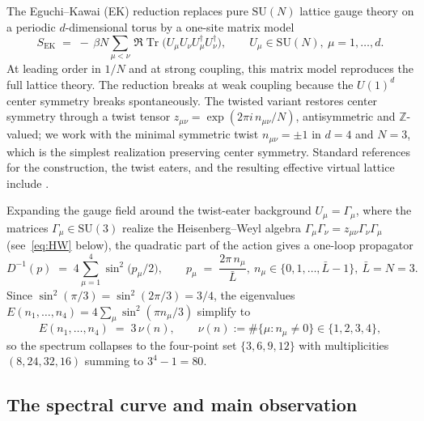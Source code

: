 \documentclass[11pt]{amsart}
\theoremstyle{definition}
\theoremstyle{remark}
\DeclareMathOperator{\Tr}{Tr}
\newcommand{\Z}{\mathbb{Z}}
\newcommand{\SU}{\mathrm{SU}}
\begin{document}
The Eguchi--Kawai (EK) reduction \cite{EguchiKawai1982} replaces pure
\(\SU(N)\) lattice gauge theory on a periodic \(d\)-dimensional torus
by a one-site matrix model
\[
  S_{\mathrm{EK}} \;=\; -\,\beta N \sum_{\mu<\nu}\,\Re\Tr\bigl(U_\mu
  U_\nu U_\mu^{\dagger} U_\nu^{\dagger}\bigr),
  \qquad U_\mu \in \SU(N),\ \mu = 1,\dots,d.
\]
At leading order in \(1/N\) and at strong coupling, this matrix model
reproduces the full lattice theory. The reduction breaks at weak
coupling because the \(U(1)^{d}\) center symmetry breaks
spontaneously. The twisted variant \cite{GonzalezArroyoOkawa1983}
restores center symmetry through a twist tensor
\(z_{\mu\nu} = \exp(2\pi i\,n_{\mu\nu}/N)\), antisymmetric and
\(\Z\)-valued; we work with the minimal symmetric twist
\(n_{\mu\nu} = \pm 1\) in \(d=4\) and \(N=3\), which is the simplest
realization preserving center symmetry. Standard references for the
construction, the twist eaters, and the resulting effective virtual
lattice include
\cite{CosterLucini2002,BringoltzSharpe2008,GonzalezArroyoOkawa2010}.

Expanding the gauge field around the twist-eater background
\(U_{\mu} = \Gamma_{\mu}\), where the matrices
\(\Gamma_{\mu} \in \SU(3)\) realize the Heisenberg--Weyl algebra
\(\Gamma_{\mu}\Gamma_{\nu} = z_{\mu\nu}\Gamma_{\nu}\Gamma_{\mu}\)
(see~\eqref{eq:HW} below), the quadratic part of the action gives a
one-loop propagator
\[
  D^{-1}(p) \;=\; 4 \sum_{\mu=1}^{4}\sin^{2}\!\bigl(p_{\mu}/2\bigr),
  \qquad
  p_{\mu} \;=\; \frac{2\pi\,n_{\mu}}{\bar{L}},\
  n_{\mu} \in \{0, 1, \dots, \bar{L}-1\},\
  \bar{L} = N = 3.
\]
Since \(\sin^{2}(\pi/3) = \sin^{2}(2\pi/3) = 3/4\), the eigenvalues
\(E(n_{1},\dots,n_{4}) = 4\sum_{\mu}\sin^{2}(\pi n_{\mu}/3)\) simplify
to
\begin{equation}\label{eq:tek-spectrum}
  E(n_{1},\dots,n_{4}) \;=\; 3\,\nu(n),
  \qquad
  \nu(n) := \#\{\mu : n_{\mu} \neq 0\} \in \{1, 2, 3, 4\},
\end{equation}
so the spectrum collapses to the four-point set \(\{3, 6, 9, 12\}\)
with multiplicities \((8, 24, 32, 16)\) summing to \(3^{4} - 1 = 80\).

\subsection*{The spectral curve and main observation}
\end{document}
